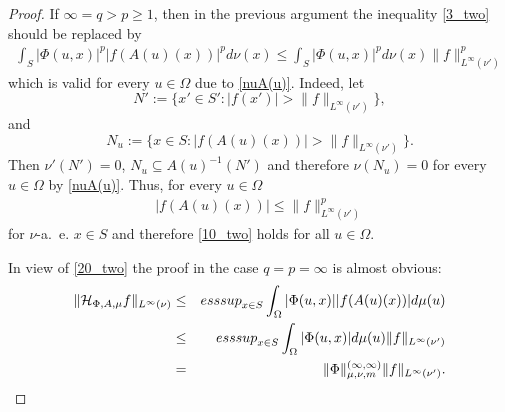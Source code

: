\documentclass[10pt,a4paper]{amsart}
\begin{document}
\begin{proof}
If $\infty=q> p\ge 1$, then in the previous argument the inequality \eqref{3_two} should be replaced by
\begin{align}\label{10_two}
\int_{S}|\Phi(u,x)|^p|f(A(u)(x))|^pd\nu(x)
\le\int_{S}|\Phi(u,x)|^{p}d\nu(x)\|f\|_{L^\infty(\nu')}^p
\end{align}
which is valid for every $u\in \Omega$ due to \eqref{nuA(u)}. Indeed, let 
$$
N':=\{x'\in S': |f(x')|>\|f\|_{L^\infty(\nu')}\},
$$
and
$$
N_u:=\{x\in S: |f(A(u)(x))|>\|f\|_{L^\infty(\nu')}\}.
$$
Then $\nu'(N')=0$, $N_u\subseteq A(u)^{-1}(N')$ and  therefore $\nu(N_u)=0$ for every $u\in \Omega$ by \eqref{nuA(u)}.
Thus, for every $u\in \Omega$ 
\begin{align}\label{20_two}
 |f(A(u)(x))|\le \|f\|_{L^\infty(\nu')}^p
 \end{align}
  for $\nu$-a.~e. $x\in S$
and therefore \eqref{10_two} holds for all $u\in \Omega$.

In view of \eqref{20_two} the proof in the case $q=p= \infty$ is almost obvious:
\begin{eqnarray*}
\|\mathcal{H}_{\Phi, A,\mu}f\|_{L^\infty(\nu)}&\leq& {\rm esssup}_{x\in S}\int_\Omega |\Phi(u,x)||f(A(u)(x))|d\mu(u)\\
&\leq & {\rm esssup}_{x\in S}\int_\Omega |\Phi(u,x)|d\mu(u)\|f\|_{L^\infty(\nu')}\\
&=&\|\Phi\|_{\mu,\nu,m}^{(\infty,\infty)}\|f\|_{L^\infty(\nu')}.
\end{eqnarray*}
\end{proof}
\end{document}
